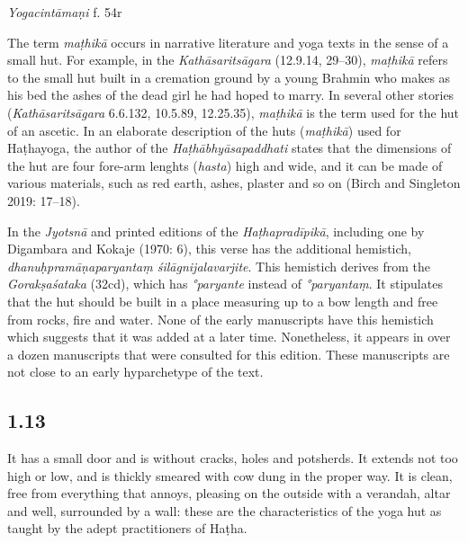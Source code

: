 \begin{ekdosis}
\begin{testimonia}[hp01_012]
\emph{Yogacintāmaṇi} f. 54r

\begin{versinnote}
\end{versinnote}

\end{testimonia}

\begin{philcomm}[hp01_012]  
The term \emph{maṭhikā} occurs in narrative literature and yoga texts in the sense of a small hut. For example, in the \textit{Kathāsaritsāgara} (12.9.14, 29–30), \emph{maṭhikā} refers to the small hut built in a cremation ground by a young Brahmin who makes as his bed the ashes of the dead girl he had hoped to marry. In several other stories (\textit{Kathāsaritsāgara} 6.6.132, 10.5.89, 12.25.35), \emph{maṭhikā} is the term used for the hut of an ascetic. In an elaborate description of the huts (\emph{maṭhikā}) used for Haṭhayoga, the author of the \emph{Haṭhābhyāsapaddhati} states that the dimensions of the hut are four fore-arm lenghts (\emph{hasta}) high and wide, and it can be made of various materials, such as red earth, ashes, plaster and so on (Birch and Singleton 2019: 17–18).

In the \emph{Jyotsnā} and printed editions of the \emph{Haṭhapradīpikā}, including one by Digambara and Kokaje (1970: 6), this verse has the additional hemistich, \emph{dhanuḥpramāṇaparyantaṃ śilāgnijalavarjite}. This hemistich derives from the \emph{Gorakṣaśataka} (32cd), which has \emph{°paryante} instead of \emph{°paryantaṃ}. It stipulates that the hut should be built in a place measuring up to a bow length and free from rocks, fire and water. None of the early manuscripts have this hemistich which suggests that it was added at a later time. Nonetheless, it appears in over a dozen manuscripts that were consulted for this edition. These manuscripts are not close to an early hyp\-archetype of the text.
\end{philcomm}

\subsection*{1.13}
\begin{translation}[hp01_013]
It has a small door and is without cracks, holes and potsherds. It extends not too high or low, and is thickly smeared with cow dung in the proper way. It is clean, free from everything that annoys, pleasing on the outside with a verandah, altar and well, surrounded by a wall: these are the characteristics of the yoga hut as taught by the adept practitioners of Haṭha.
\end{translation}


\end{ekdosis}
